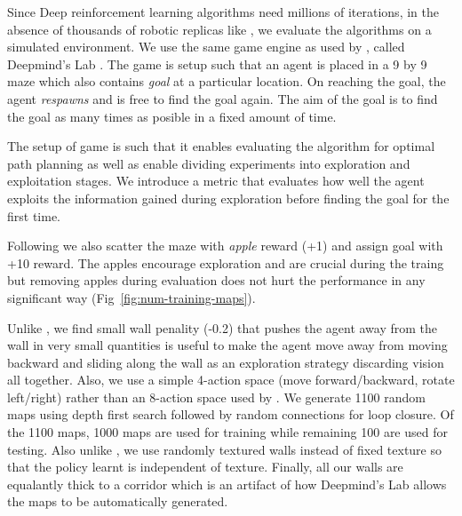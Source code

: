 Since Deep reinforcement learning algorithms need millions of iterations, in the absence of thousands of robotic replicas like \cite{LePaKrISER2017}, we evaluate the algorithms on a simulated environment.
We use the same game engine as used by \cite{MiPaViICLR2017}, called Deepmind's Lab \cite{BeLeTeARXIV2016}.
The game is setup such that an agent is placed in a 9 by 9 maze which also contains \emph{goal} at a particular location.
On reaching the goal, the agent \emph{respawns} and is free to find the goal again.
The aim of the goal is to find the goal as many times as posible in a fixed amount of time.

The setup of game is such that it enables evaluating the algorithm for optimal path planning as well as enable dividing experiments into exploration and exploitation stages.
We introduce a metric that evaluates how well the agent exploits the information gained during exploration before finding the goal for the first time.

Following \cite{MiPaViICLR2017} we also scatter the maze with \emph{apple} reward (+1) and assign goal with +10 reward.
The apples encourage exploration and are crucial during the traing but removing apples during evaluation does not hurt the performance in any significant way (Fig~\ref{fig:num-training-maps}).

Unlike \cite{MiPaViICLR2017}, we find small wall penality (-0.2) that pushes the agent away from the wall in very small quantities is useful to make the agent move away from moving backward and sliding along the wall as an exploration strategy discarding vision all together.
Also, we use a simple 4-action space (move forward/backward, rotate left/right) rather than an 8-action space used by \cite{MiPaViICLR2017}.
We generate 1100 random maps using depth first search followed by random connections for loop closure.
Of the 1100 maps, 1000 maps are used for training while remaining 100 are used for testing.
Also unlike \cite{MiPaViICLR2017}, we use randomly textured walls instead of fixed texture so that the policy learnt is independent of texture.
Finally, all our walls are equalantly thick to a corridor which is an artifact of how Deepmind's Lab allows the maps to be automatically generated.

